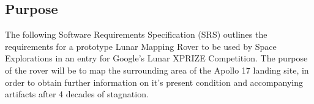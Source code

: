 \documentclass{article}
\begin{document}
\subsection{Purpose}
\begin{adjustwidth}{1em}{0pt}
The following Software Requirements Specification (SRS) outlines the requirements for a prototype Lunar Mapping Rover to be used by Space Explorations in an entry for Google's Lunar XPRIZE Competition. The purpose of the rover will be to map the surrounding area of the Apollo 17 landing site, in order to obtain further information on it's present condition and accompanying artifacts after 4 decades of stagnation.

\begin{comment}
This documents lays out the requirements for the prototype Lunar Rover Mapping Robot to be used by our client, Space Explorations, and entered into the Google Lunar XPRIZE competition. The purpose of this robot is to map the surrounding area of the Apollo 17 landing site in order to find out more information about the present condition of the landing site and it's artifacts after over 4 decades.
\end{comment}

\end{adjustwidth}
\end{document}
